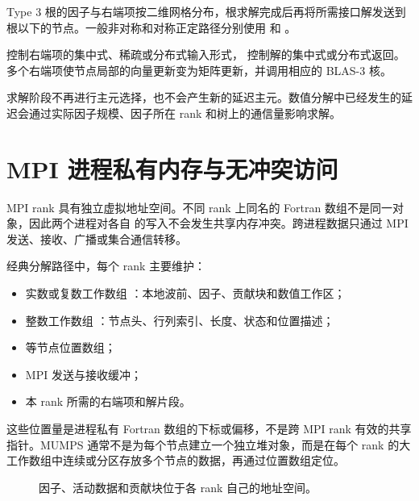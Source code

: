 Type 3 根的因子与右端项按二维网格分布，根求解完成后再将所需接口解发送到根以下的节点。一般非对称和对称正定路径分别使用  和 。

 控制右端项的集中式、稀疏或分布式输入形式， 控制解的集中式或分布式返回。多个右端项使节点局部的向量更新变为矩阵更新，并调用相应的 BLAS-3 核。

求解阶段不再进行主元选择，也不会产生新的延迟主元。数值分解中已经发生的延迟会通过实际因子规模、因子所在 rank 和树上的通信量影响求解。

\section{MPI 进程私有内存与无冲突访问}

MPI rank 具有独立虚拟地址空间。不同 rank 上同名的 Fortran 数组不是同一对象，因此两个进程对各自  的写入不会发生共享内存冲突。跨进程数据只通过 MPI 发送、接收、广播或集合通信转移。

经典分解路径中，每个 rank 主要维护：

\begin{itemize}
  \item 实数或复数工作数组 ：本地波前、因子、贡献块和数值工作区；
  \item 整数工作数组 ：节点头、行列索引、长度、状态和位置描述；
  \item {} 等节点位置数组；
  \item MPI 发送与接收缓冲；
  \item 本 rank 所需的右端项和解片段。
\end{itemize}

这些位置量是进程私有 Fortran 数组的下标或偏移，不是跨 MPI rank 有效的共享指针。MUMPS 通常不是为每个节点建立一个独立堆对象，而是在每个 rank 的大工作数组中连续或分区存放多个节点的数据，再通过位置数组定位。

\begin{figure}[htbp]
\centering
{}
\caption{因子、活动数据和贡献块位于各 rank 自己的地址空间。}
\label{fig:local-memory}
\end{figure}


